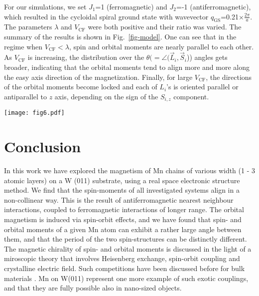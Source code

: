 \documentclass[prl,final,twocolumn]{revtex4-1}
\begin{document}
For our simulations, we set $J_1$=1 (ferromagnetic) and $J_2$=-1 (antiferromagnetic), which resulted in the cycloidal spiral ground state with wavevector $q_{\mathrm{GS}}$=0.21$\times\frac{2\pi}{a}$.
The parameters $\lambda$ and $V_{\mathrm{CF}}$ were both positive and their ratio was varied.
The summary of the results is shown in Fig.~\ref{fig-model}.
One can see that in the regime when $V_{\mathrm{CF}} < \lambda$, spin and orbital moments are nearly parallel to each other. 
As $V_{\mathrm{CF}}$ is increasing, the distribution over the $\theta(=\angle (\vec L_i,\vec S_i$)) angles gets broader, indicating that the orbital moments tend to align more and more along the easy axis direction of the magnetization.
Finally, for large $V_{\mathrm{CF}}$, the directions of the orbital moments become locked and each of $L_i$'s is oriented parallel or antiparallel to $z$ axis, depending on the sign of the $S_{i,z}$ component.

\begin{figure*}[!t]
\texttt{[image: fig6.pdf]} 
\caption{Left: Histogram of the obtained distribution of the angles ($\theta$) between spin and orbital moments at each site. Right: The ground state magnetic order. Spin (orbital) moments are shown at violet (orange) arrows. $Z$ axis is along the direction of the wire.}
\label{fig-model}
\end{figure*}

\section{Conclusion}
In this work we have explored the magnetism of Mn chains of various width (1 - 3 atomic layers) on a W (011) substrate, using a real space electronic structure method. We find that the spin-moments of all investigated systems align in a non-collinear way. This is the result of antiferromagnetic nearest neighbour interactions, coupled to ferromagnetic interactions of longer range. The orbital magnetism is induced via spin-orbit effects, and we have found that spin- and orbital moments of a given Mn atom can exhibit a rather large angle between them, and that the period of the two spin-structures can be distinctly different. 
The magnetic chirality of spin- and orbital moments is discussed in the light of a miroscopic theory that involves Heisenberg exchange, spin-orbit coupling and crystalline electric field. Such competitions have been discussed before for bulk materials \cite{PhysRevB.89.064428,PhysRevB.90.165130}.
Mn on W(011) represent one more example of such exotic couplings, and that they are fully possible also in nano-sized objects. 
\end{document}
